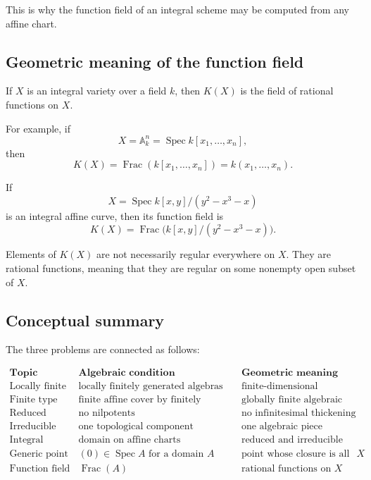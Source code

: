 \documentclass[12pt,a4paper]{article}
\DeclareMathOperator{\Spec}{Spec}
\newcommand{\Frac}{\operatorname{Frac}}
\providecommand{\Spec}{\operatorname{Spec}}
\theoremstyle{notespace}
\begin{document}
This is why the function field of an integral scheme may be computed from any affine chart.

\subsection{Geometric meaning of the function field}

If \(X\) is an integral variety over a field \(k\), then \(K(X)\) is the field of rational functions on \(X\).

For example, if
\[
X=\mathbb A_k^n=\Spec k[x_1,\dots,x_n],
\]
then
\[
K(X)=\Frac(k[x_1,\dots,x_n])=k(x_1,\dots,x_n).
\]

If
\[
X=\Spec k[x,y]/(y^2-x^3-x)
\]
is an integral affine curve, then its function field is
\[
K(X)=\Frac\bigl(k[x,y]/(y^2-x^3-x)\bigr).
\]

Elements of \(K(X)\) are not necessarily regular everywhere on \(X\). They are rational functions, meaning that they are regular on some nonempty open subset of \(X\).

\subsection{Conceptual summary}

The three problems are connected as follows:

\[
\begin{array}{c|c|c}
	\textbf{Topic} & \textbf{Algebraic condition} & \textbf{Geometric meaning} \\
	\hline
	\text{Locally finite type} &
	\text{locally finitely generated algebras} &
	\text{finite-dimensional algebraic behavior locally}
	\\[4pt]
	\text{Finite type} &
	\text{finite affine cover by finitely generated algebras} &
	\text{globally finite algebraic family}
	\\[4pt]
	\text{Reduced} &
	\text{no nilpotents} &
	\text{no infinitesimal thickening}
	\\[4pt]
	\text{Irreducible} &
	\text{one topological component} &
	\text{one algebraic piece}
	\\[4pt]
	\text{Integral} &
	\text{domain on affine charts} &
	\text{reduced and irreducible}
	\\[4pt]
	\text{Generic point} &
	(0)\in \Spec A \text{ for a domain } A &
	\text{point whose closure is all of }X
	\\[4pt]
	\text{Function field} &
	\Frac(A) &
	\text{rational functions on }X
\end{array}
\]
\end{document}
